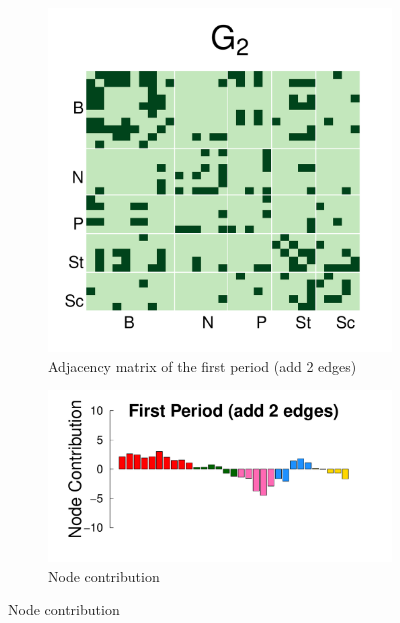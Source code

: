 \documentclass[12pt]{article}
\begin{document}
\begin{figure}[H]
	\centering
	\begin{subfigure}[b]{0.3\textwidth}
		\includegraphics[width=\textwidth]{../Figure/sim_Adj2.pdf}
		\caption{Adjacency matrix of the first period (add 2 edges)}
		\label{fig:step2}
	\end{subfigure}
	\begin{subfigure}[b]{0.6\textwidth}
		\includegraphics[width=\textwidth]{../Figure/step2.pdf}
		\caption{Node contribution}
		\label{fig:adj.step2}
	\end{subfigure}
\end{figure}
\end{document}

